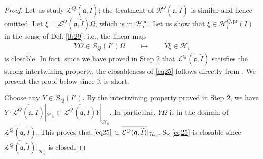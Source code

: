 \documentclass[11pt,b5paper,notitlepage]{article}
\theoremstyle{definition}
\theoremstyle{plain}
\newcommand{\fk}{\mathfrak}
\newcommand{\mc}{\mathcal}
\newcommand{\wtd}{\widetilde}
\newcommand{\ovl}{\overline}
\newcommand{\pr}{\mathrm {pr}}
\numberwithin{equation}{section}
\begin{document}
\begin{proof}
Let us study $\mc L^Q(\fk a,\wtd I)$; the treatment of $\mc R^Q(\fk a,\wtd I)$ is similar and hence omitted. Let $\xi=\mc L^Q(\fk a,\wtd I)\Omega$, which is in $\mc H_i^\infty$. Let us show that $\xi\in\mc H_i^{Q,\pr}(I)$ in the sense of Def. \ref{lb29}, i.e., the linear map
\begin{align}
Y\Omega\in\mc B_Q(I')\Omega\qquad\mapsto \qquad Y\xi\in\mc H_i \label{eq25}
\end{align}
is closable. In fact, since we have proved in Step 2 that $\mc L^Q(\fk a,\wtd I)$ satisfies the strong intertwining property, the closableness of \eqref{eq25} follows directly from \cite[Prop. 1.4.5]{Gui20}. We present the proof below since it is short: 

Choose any $Y\in\mc B_Q(I')$. By the intertwining property proved in Step 2, we have $Y\cdot \ovl{\mc L^Q(\fk a,\wtd I)}|_{\mc H_a}\subset \ovl{\mc L^Q(\fk a,\wtd I)} Y|_{\mc H_a}$. In particular, $Y\Omega$ is in the domain of $\ovl{\mc L^Q(\fk a,\wtd I)}$. This proves that $\eqref{eq25}\subset \ovl{\mc L^Q(\fk a,\wtd I)} |_{\mc H_a}$. So \eqref{eq25} is closable since $\ovl{\mc L^Q(\fk a,\wtd I)} |_{\mc H_a}$ is closed.


\end{proof}
\end{document}
